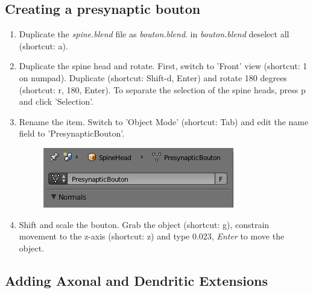 \documentclass[twoside,a4paper]{refart}
\begin{document}
\subsection{Creating a presynaptic bouton}

\begin{enumerate}
    \item   Duplicate the \textit{spine.blend} file as \textit{bouton.blend}. in \textit{bouton.blend} deselect all (shortcut: a).
    
\item   Duplicate the spine head and rotate. First, switch to 'Front' view (shortcut: 1 on numpad). Duplicate (shortcut: Shift-d, Enter) and rotate 180 degrees (shortcut: r, 180, Enter). To separate the selection of the spine heads, press p and click 'Selection'.

\item   Rename the item. Switch to 'Object Mode' (shortcut: Tab) and edit the name field to 'PresynapticBouton'.
        \begin{figure}[H]
        \includegraphics[scale=0.5]{bouton1.png}
        \end{figure}

\item   Shift and scale the bouton. Grab the object (shortcut: g), constrain movement to the z-axis (shortcut: z) and type 0.023, \textit{Enter} to move the object. 
\end{enumerate}

\subsection{Adding Axonal and Dendritic Extensions}
\end{document}
